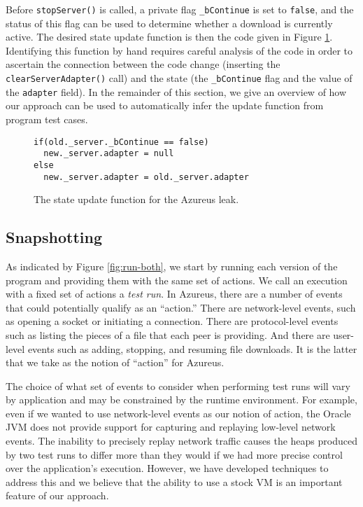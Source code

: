 Before \texttt{stopServer()} is called, a private flag
\texttt{\_bContinue} is set to \texttt{false}, and the status of this
flag can be used to determine whether a download is currently active.
The desired state update function is then the code given in Figure
\ref{fig:leak-1-state-update}.  Identifying this function by hand
requires careful analysis of the code in order to ascertain the
connection between the code change (inserting the
\texttt{clearServerAdapter()} call) and the state (the
\texttt{\_bContinue} flag and the value of the \texttt{adapter}
field).  In the remainder of this section, we give an overview of how
our approach can be used to automatically infer the update function
from program test cases.

\begin{figure}
\begin{verbatim}
if(old._server._bContinue == false)
  new._server.adapter = null
else
  new._server.adapter = old._server.adapter
\end{verbatim}
\caption{\label{fig:leak-1-state-update}The state update function for
  the Azureus leak.}
\end{figure}

\subsection{Snapshotting}

As indicated by Figure \ref{fig:run-both}, we start by running each
version of the program and providing them with the same set of
actions.  We call an execution with a fixed set of actions a
\emph{test run}.  In Azureus, there are a number of events that could
potentially qualify as an ``action.''  There are network-level events,
such as opening a socket or initiating a connection.  There are
protocol-level events such as listing the pieces of a file that each
peer is providing.  And there are user-level events such as adding,
stopping, and resuming file downloads.  It is the latter that we take
as the notion of ``action'' for Azureus.

The choice of what set of events to consider when performing test runs
will vary by application and may be constrained by the runtime
environment.  For example, even if we wanted to use network-level
events as our notion of action, the Oracle JVM does not provide
support for capturing and replaying low-level network events.  The
inability to precisely replay network traffic causes the heaps
produced by two test runs to differ more than they would if we had
more precise control over the application's execution.  However, we
have developed techniques to address this and we believe that the
ability to use a stock VM is an important feature of our approach.

